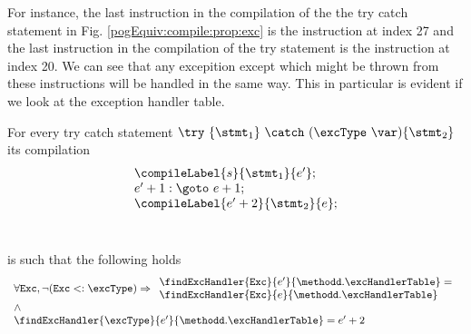 For instance, the last instruction in the compilation of the the try catch statement  in Fig. \ref{pogEquiv:compile:prop:exc} 
is the instruction at index 27 and the last instruction in the compilation of the try statement is the instruction at index 20. 
We can see that any excepition except \NullPointerExc{} which might be thrown from these instructions 
will be handled in the same way. This in particular is evident if we look at the exception handler table.
 
\begin{compProp10}\label{compile:prop:compProp10}
For every try catch statement $ \try \ \{ \stmt_1 \} \ \catch \ (\excType \ \var )\{ \stmt_2 \}  $ 
its compilation $$
\begin{array}{l} 
\compileLabel{s}{\stmt_1}{e'}; \\
                       e' + 1: \goto \ e + 1; \\
		  
                       \compileLabel{e' + 2 }{\stmt_2}{e };\\
		       \\ \\

 \end{array}$$
is such that the following holds 
$$\begin{array}{l} \forall \mbox{\rm{\texttt{Exc}}},  \neg ( \mbox{\rm{\texttt{Exc}}} <: \excType ) \Rightarrow
  \begin{array}{l}  
         \findExcHandler{\mbox{\rm\tt{Exc}} }{e'}{\methodd.\excHandlerTable} =\\ 
    \findExcHandler{\mbox{\rm\tt{Exc}} }{e}{\methodd.\excHandlerTable}  \\
   \end{array} \\
   \wedge\\
  \findExcHandler{\excType }{e'}{\methodd.\excHandlerTable} = e'+2 \\ 
 \end{array} $$



\end{compProp10}





